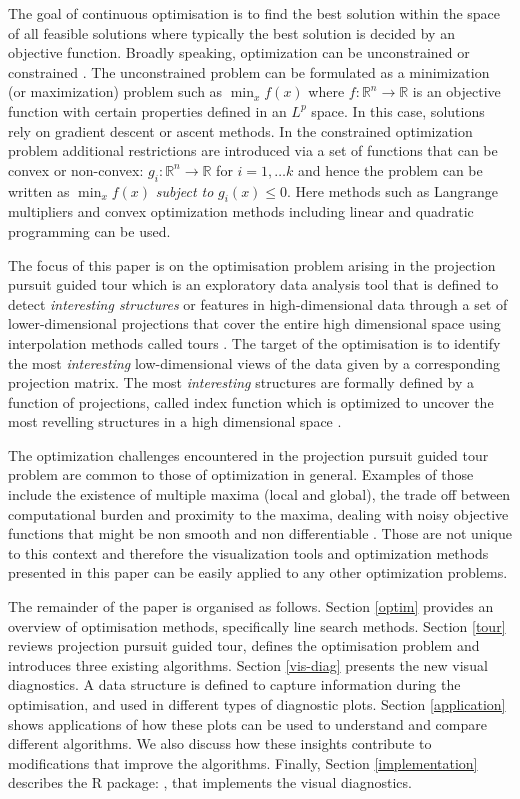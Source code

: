 The goal of continuous optimisation is to find the best solution within
the space of all feasible solutions where typically the best solution is
decided by an objective function. Broadly speaking, optimization can be
unconstrained or constrained \citep{kelley1999iterative}. The
unconstrained problem can be formulated as a minimization (or
maximization) problem such as \(\min_{x} f(x)\) where
\(f:\mathbb{R}^n \rightarrow \mathbb{R}\) is an objective function with
certain properties defined in an \(L^p\) space. In this case, solutions
rely on gradient descent or ascent methods. In the constrained
optimization problem additional restrictions are introduced via a set of
functions that can be convex or non-convex:
\(g_i:\mathbb{R}^n \rightarrow \mathbb{R}\) for \(i = 1, \ldots k\) and
hence the problem can be written as \(\min_{x} f(x)\) \emph{subject to}
\(g_i(x) \leq 0\). Here methods such as Langrange multipliers and convex
optimization methods including linear and quadratic programming can be
used.

The focus of this paper is on the optimisation problem arising in the
projection pursuit guided tour \citep{buja2005computational} which is an
exploratory data analysis tool that is defined to detect
\emph{interesting structures} or features in high-dimensional data
through a set of lower-dimensional projections that cover the entire
high dimensional space using interpolation methods called tours
\citep{cook2008grand}. The target of the optimisation is to identify the
most \emph{interesting} low-dimensional views of the data given by a
corresponding projection matrix. The most \emph{interesting} structures
are formally defined by a function of projections, called index function
which is optimized to uncover the most revelling structures in a high
dimensional space \citep{cook1993projection}.

The optimization challenges encountered in the projection pursuit guided
tour problem are common to those of optimization in general. Examples of
those include the existence of multiple maxima (local and global), the
trade off between computational burden and proximity to the maxima,
dealing with noisy objective functions that might be non smooth and non
differentiable \citep{jones1998efficient}. Those are not unique to this
context and therefore the visualization tools and optimization methods
presented in this paper can be easily applied to any other optimization
problems.

The remainder of the paper is organised as follows. Section \ref{optim}
provides an overview of optimisation methods, specifically line search
methods. Section \ref{tour} reviews projection pursuit guided tour,
defines the optimisation problem and introduces three existing
algorithms. Section \ref{vis-diag} presents the new visual diagnostics.
A data structure is defined to capture information during the
optimisation, and used in different types of diagnostic plots. Section
\ref{application} shows applications of how these plots can be used to
understand and compare different algorithms. We also discuss how these
insights contribute to modifications that improve the algorithms.
Finally, Section \ref{implementation} describes the R package:
, that implements the visual diagnostics.

